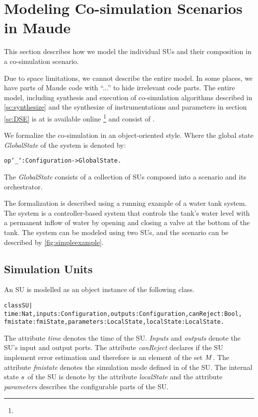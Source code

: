 \section{Modeling Co-simulation Scenarios in Maude}
This section describes how we model the individual SUs and their composition in a co-simulation scenario.

Due to space limitations, we cannot describe the entire model. 
In some places, we have parts of Maude code with ``...'' to hide irrelevant code parts.
The entire model, including synthesis and execution of co-simulation algorithms described in \cref{sc:synthesize} and the synthesize of instrumentations and parameters in section \cref{sc:DSE} is at is available online \footnote{} and consist of .

We formalize the co-simulation in an object-oriented style.
Where the global state \textit{GlobalState} of the system is denoted by:
\begin{alltt}
\small
op `{_`} : Configuration -> GlobalState .
\end{alltt}

The \textit{GlobalState} consists of a collection of SUs composed into a scenario and its orchestrator.


The formalization is described using a running example of a water tank system.
The system is a controller-based system that controls the tank's water level with a permanent inflow of water by opening and closing a valve at the bottom of the tank.
The system can be modeled using two SUs, and the scenario can be described by \cref{fig:simpleexample}. 

\subsection{Simulation Units}
An SU is modelled as an object instance of the following class.%
\begin{alltt}
  \small
class SU |
time : Nat, inputs : Configuration, outputs : Configuration, canReject : Bool, 
fmistate : fmiState, parameters : LocalState, localState : LocalState .
\end{alltt}

The attribute \textit{time} denotes the time of the SU.
\textit{Inputs} and \textit{outputs} denote the SU's input and output ports.
The attribute \textit{canReject} declares if the SU implement error estimation and therefore is an element of the set $M$.
The attribute \textit{fmistate} denotes the simulation mode defined in \cite{FMI2014} of the SU.
The internal state $s_{}$ of the SU is denote by the attribute \textit{localState} and the attribute \textit{parameters} describes the configurable parts of the SU.

